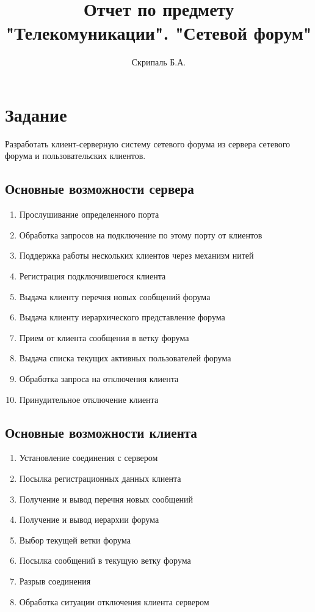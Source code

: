 \documentclass[10pt,a4paper]{report}
\begin{document}
\begin{titlepage}
\title{Отчет по предмету "Телекомуникации". "Сетевой форум"}
\author{Скрипаль Б.А.}
\end{titlepage}
\maketitle
\chapter{Задание}
Разработать клиент-серверную систему сетевого форума из сервера сетевого форума и пользовательских клиентов.
\section{Основные возможности сервера}
\begin{enumerate}
\item Прослушивание определенного порта
\item Обработка запросов на подключение по этому порту от клиентов
\item Поддержка работы нескольких клиентов через механизм нитей
\item Регистрация подключившегося клиента
\item Выдача клиенту перечня новых сообщений форума
\item Выдача клиенту иерархического представление форума
\item Прием от клиента сообщения в ветку форума
\item Выдача списка текущих активных пользователей форума
\item Обработка запроса на отключения клиента
\item Принудительное отключение клиента
\end{enumerate}
\section{Основные возможности клиента}
\begin{enumerate}
\item Установление соединения с сервером
\item Посылка регистрационных данных клиента
\item Получение и вывод перечня новых сообщений 
\item Получение и вывод иерархии форума
\item Выбор текущей ветки форума
\item Посылка сообщений в текущую ветку форума
\item Разрыв соединения
\item Обработка ситуации отключения клиента сервером
\end{enumerate}
\end{document}

